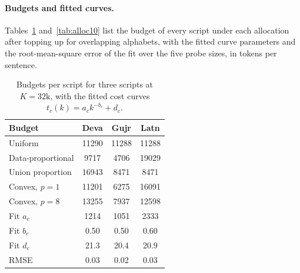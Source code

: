 \paragraph{Budgets and fitted curves.}
Tables~\ref{tab:alloc3} and~\ref{tab:alloc10} list the budget of every script under each
allocation after topping up for overlapping alphabets, with the fitted curve parameters and the root-mean-square
error of the fit over the five probe sizes, in tokens per sentence.

\begin{table}[t]
\centering
\small
\begin{tabular}{lccc}
\toprule
Budget & Deva & Gujr & Latn\\
\midrule
Uniform & 11290 & 11288 & 11288\\
Data-proportional & 9717 & 4706 & 19029\\
Union proportion & 16943 & 8471 & 8471\\
Convex, $p=1$ & 11201 & 6275 & 16091\\
Convex, $p=8$ & 13255 & 7937 & 12598\\
\midrule
Fit $a_c$ & 1214 & 1051 & 2333\\
Fit $b_c$ & 0.50 & 0.50 & 0.60\\
Fit $d_c$ & 21.3 & 20.4 & 20.9\\
RMSE & 0.03 & 0.02 & 0.03\\
\bottomrule
\end{tabular}
\caption{Budgets per script for three scripts at $K=32\mathrm{k}$, with the fitted cost curves $t_c(k)=a_c k^{-b_c}+d_c$.}
\label{tab:alloc3}
\end{table}

